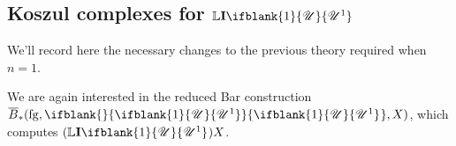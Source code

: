 \documentclass[10pt]{article}
\makeatletter
\newcommand{\LL}[1]{\ifblank{#1}{\scrK}{\scrK^{#1}}}
\newcommand{\nontop}[1]{\ifblank{#1}{\scrU}{\scrU^{#1}}}
\newcommand{\produces}[3]{{#1}{#3}{#2}}
\newcommand{\Ind}[2][]{\mathbf{I}{#2}_{#1}}%
\newcommand{\forget}{\mathrm{fg}}
\newcommand{\Fr}[2][]{\ifblank{#1}{#2}{#2_{#1}}}
\newcommand{\derived}{\mathbb{L}}
\newcommand{\minDimP}{\overline{m}}
\renewcommand{\produces}[3]{
{
\def\labelstyle{\scriptstyle}
\xymatrix@C=2em@1{
{#1}
\ar@{-}[r]|-{{\,#3\,}}
&%
{#2}%
}}}
\makeatother
\begin{document}
\begin{KoszulComplexes1}
\subsection{Koszul complexes for $\derived\Ind{\nontop{1}}$}
We'll record here the necessary changes to the previous theory required when $n=1$.


We are again interested in the reduced Bar construction $\overline{B}_*(\forget,\Fr{\nontop{1}},X)$, which computes $(\derived\Ind{\nontop{1}})X$.



\end{KoszulComplexes1}
\end{document}
